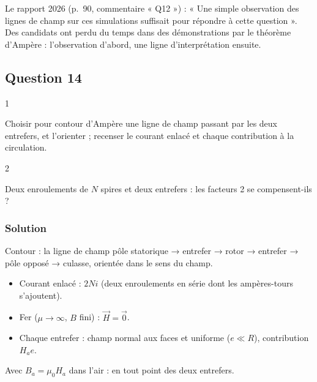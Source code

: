 \documentclass[11pt,a4paper]{article}
\providecommand{\tightlist}{\setlength{\itemsep}{0pt}\setlength{\parskip}{0pt}}
\newcommand{\equationajustee}[1]{%
  \sbox{\boiteequation}{$\displaystyle #1$}%
  \ifdim\wd\boiteequation>\linewidth
    \[\resizebox{\linewidth}{!}{\usebox{\boiteequation}}\]%
  \else
    \[#1\]%
  \fi}
\begin{document}
\begin{jury}

Le rapport 2026 (p.~90, commentaire « Q12 ») : « Une simple observation des lignes de champ sur ces simulations suffisait pour répondre à cette question ». Des candidats ont perdu du temps dans des démonstrations par le théorème d'Ampère : l'observation d'abord, une ligne d'interprétation ensuite.

\end{jury}

\hypertarget{question-14}{%
\subsection{Question 14}\label{question-14}}

\begin{indication}{1}

Choisir pour contour d'Ampère une ligne de champ passant par les deux entrefers, et l'orienter ; recenser le courant enlacé et chaque contribution à la circulation.

\end{indication}

\begin{indication}{2}

Deux enroulements de \(N\) spires et deux entrefers : les facteurs 2 se compensent-ils ?

\end{indication}

\hypertarget{solution-13}{%
\subsubsection{Solution}\label{solution-13}}

Contour : la ligne de champ pôle statorique → entrefer → rotor → entrefer → pôle opposé → culasse, orientée dans le sens du champ.

\begin{itemize}
\tightlist
\item
  Courant enlacé : \(2Ni\) (deux enroulements en série dont les ampères-tours s'ajoutent).
\item
  Fer (\(\mu\to\infty\), \(B\) fini) : \(\vec H=\vec 0\).
\item
  Chaque entrefer : champ normal aux faces et uniforme (\(e\ll R\)), contribution \(H_ae\).
\end{itemize}

\equationajustee{2H_ae=2Ni}
Avec \(B_a=\mu_0H_a\) dans l'air :
\equationajustee{\boxed{B_a=\frac{\mu_0Ni}{e}}}
en tout point des deux entrefers.
\end{document}
